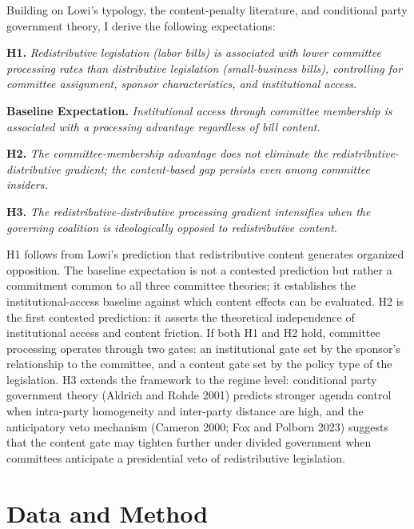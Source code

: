 \documentclass[11pt]{article}
\begin{document}
Building on Lowi's typology, the content-penalty literature, and conditional party government theory, I derive the following expectations:

\medskip
\noindent\textbf{H1.} \textit{Redistributive legislation (labor bills) is associated with lower committee processing rates than distributive legislation (small-business bills), controlling for committee assignment, sponsor characteristics, and institutional access.}

\medskip
\noindent\textbf{Baseline Expectation.} \textit{Institutional access through committee membership is associated with a processing advantage regardless of bill content.}

\medskip
\noindent\textbf{H2.} \textit{The committee-membership advantage does not eliminate the redistributive-distributive gradient; the content-based gap persists even among committee insiders.}

\medskip
\noindent\textbf{H3.} \textit{The redistributive-distributive processing gradient intensifies when the governing coalition is ideologically opposed to redistributive content.}

\medskip
\noindent H1 follows from Lowi's prediction that redistributive content generates organized opposition. The baseline expectation is not a contested prediction but rather a commitment common to all three committee theories; it establishes the institutional-access baseline against which content effects can be evaluated. H2 is the first contested prediction: it asserts the theoretical independence of institutional access and content friction. If both H1 and H2 hold, committee processing operates through two gates: an institutional gate set by the sponsor's relationship to the committee, and a content gate set by the policy type of the legislation. H3 extends the framework to the regime level: conditional party government theory (Aldrich and Rohde 2001) predicts stronger agenda control when intra-party homogeneity and inter-party distance are high, and the anticipatory veto mechanism (Cameron 2000; Fox and Polborn 2023) suggests that the content gate may tighten further under divided government when committees anticipate a presidential veto of redistributive legislation.


\section{Data and Method}
\label{sec:method}
\end{document}
